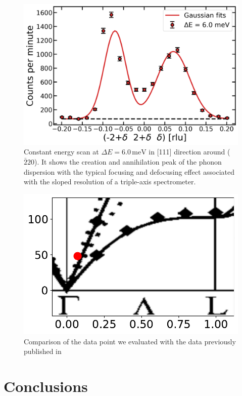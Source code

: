 \documentclass[aps,prx,reprint,amsmath,amssymb,superscriptaddress,showpacs]{revtex4-1}
\begin{document}
\begin{figure}
    \includegraphics[width=1.0\linewidth]{mini-school-si-cescan.png}
    \caption{\label{fig1} Constant energy scan at $\Delta E = 6.0\,\mathrm{meV}$ in [111] direction around ($\bar{2}20$). It shows the creation and annihilation peak of the phonon dispersion with the typical focusing and defocusing effect associated with the sloped resolution of a triple-axis spectrometer.}
\end{figure}

\begin{figure}
    \includegraphics[width=1.0\linewidth]{dispersion.pdf}
    \caption{Comparison of the data point we evaluated with the data previously published in \cite{Aouissi} }
    \label{fig2}
\end{figure}



\section{Conclusions}
\end{document}
